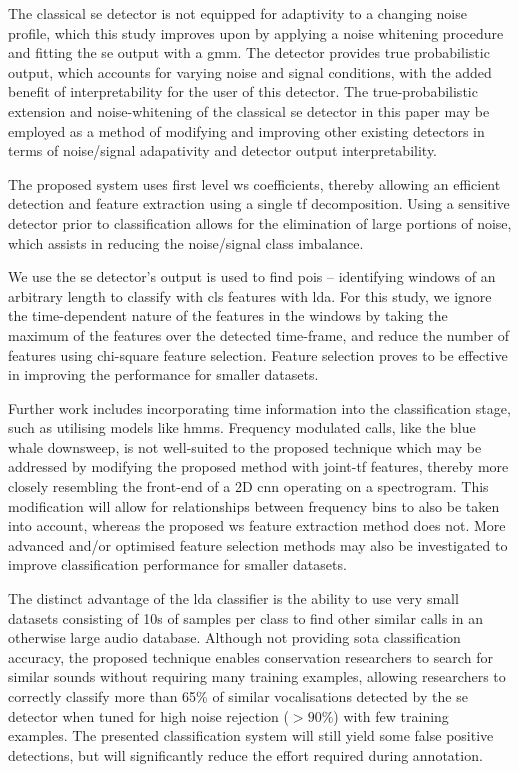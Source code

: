 {The classical \ac{se} detector is not equipped for adaptivity to a changing noise profile, which this study improves upon by applying a noise whitening procedure and fitting the \ac{se} output with a \ac{gmm}. The detector provides true probabilistic output, which accounts for varying noise and signal conditions, with the added benefit of interpretability for the user of this detector. The true-probabilistic extension and noise-whitening of the classical \ac{se} detector in this paper may be employed as a method of modifying and improving other existing detectors in terms of noise/signal adapativity and detector output interpretability.

The proposed system uses first level \ac{ws} coefficients, thereby allowing an efficient detection and feature extraction using a single \ac{tf} decomposition. Using a sensitive detector prior to classification allows for the elimination of large portions of noise, which assists in reducing the noise/signal class imbalance.

We use the \ac{se} detector's output is used to find \acp{poi} -- identifying windows of an arbitrary length to classify with \ac{cls} features with \ac{lda}. For this study, we ignore the time-dependent nature of the features in the windows by taking the maximum of the features over the detected time-frame, and reduce the number of features using chi-square feature selection. Feature selection proves to be effective in improving the performance for smaller datasets. 

Further work includes incorporating time information into the classification stage, such as utilising models like \acp{hmm}. Frequency modulated calls, like the blue whale downsweep, is not well-suited to the proposed technique which may be addressed by modifying the proposed method with joint-\ac{tf} features, thereby more closely resembling the front-end of a 2D \ac{cnn} operating on a spectrogram. This modification will allow for relationships between frequency bins to also be taken into account, whereas the proposed \ac{ws} feature extraction method does not. More advanced and/or optimised feature selection methods may also be investigated to improve classification performance for smaller datasets.

The distinct advantage of the \ac{lda} classifier is the ability to use very small datasets consisting of 10s of samples per class to find other similar calls in an otherwise large audio database. Although not providing \ac{sota} classification accuracy, the proposed technique enables conservation researchers to search for similar sounds without requiring many training examples, allowing researchers to correctly classify more than 65\% of similar vocalisations detected by the \ac{se} detector when tuned for high noise rejection ($> 90\%$) with few training examples. The presented classification system will still yield some false positive detections, but will significantly reduce the effort required during annotation.

}
